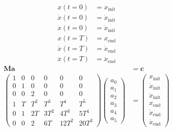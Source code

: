 \begin{align}
	x(t = 0) &= x_\text{init} \\
	\dot{x}(t=0) &= \dot{x}_\text{init} \\
	\ddot{x}(t=0) &= \ddot{x}_\text{init} \\
	x(t=T) &= x_\text{end}\\
	\dot{x}(t=T) &= \dot{x}_\text{end} \\
	\ddot{x}(t=T) &= \ddot{x}_\text{end} 
\end{align}
\begin{align}
	\bm{M}\bm{a} &= \bm{c} \\
	\begin{pmatrix}
		1 & 0 & 0 & 0 & 0 & 0 \\
		0 & 1 & 0 & 0 & 0 & 0 \\
		0 & 0 & 2 & 0 & 0 & 0 \\
		1 & T & T^2 & T^3 & T^4 & T^5 \\
		0 & 1 & 2 T & 3 T^2 & 4 T^3 & 5 T^4 \\
		0 & 0 & 2 & 6 T & 12 T^2 & 20 T^3
	\end{pmatrix}
	\begin{pmatrix}
		a_0 \\
		a_1 \\
		a_2 \\
		a_3 \\
		a_4 \\
		a_5
	\end{pmatrix} &=
	\begin{pmatrix}
		x_\text{init} \\
		\dot{x}_\text{init} \\
		\ddot{x}_\text{init} \\
		x_\text{end} \\
		\dot{x}_\text{end} \\
		\ddot{x}_\text{end} 
	\end{pmatrix}
\end{align}
